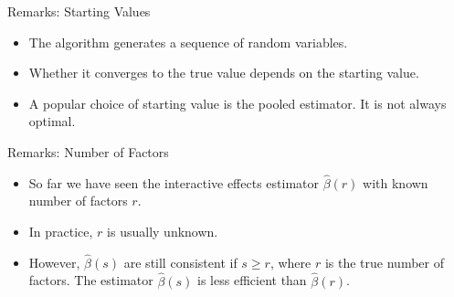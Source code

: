 \documentclass{beamer}
\begin{document}










\begin{frame}{Remarks: Starting Values}
    \begin{itemize}
        \item The algorithm generates a sequence of random variables.
        \item Whether it converges to the true value depends on the starting value.
        \item A popular choice of starting value is the pooled estimator. It is not always optimal.
    \end{itemize}
\end{frame}

\begin{frame}{Remarks: Number of Factors}
    \begin{itemize}
        \item So far we have seen the interactive effects estimator $\hat \beta(r)$ with known number of factors $r$.
        \item In practice, $r$ is usually unknown.
        \item However, $\hat \beta (s)$ are still consistent if $s\geq r$, where $r$ is the true number of factors. The estimator $\hat \beta (s)$ is less efficient than $\hat \beta (r)$.
    \end{itemize}
\end{frame}
\end{document}
